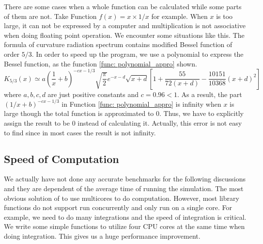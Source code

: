 \documentclass[12pt]{report}
\begin{document}
          There are some cases when a whole function can be calculated while some parts of them are not. 
          Take Function $f\left(x\right) = x\times1/x$ for example. When $x$ is too large, it 
          can not be expressed by a computer and multiplication is not associative when doing floating 
          point operation. We encounter some situations like this.
          The formula of curvature radiation spectrum contains modified Bessel function of order $5/3$.
          In order to speed up the program, we use a polynomial to express the Bessel function, as the 
          function \ref{func: polynomial_appro} shown. 
          \begin{equation}
            K_{5/3} \left(x\right) \simeq a \left(\frac{1}{x} + b\right)^{-cx - 1/3} \sqrt{\frac{\pi}{2}} e^{-x - d} \sqrt{x + d} %
            \left[1 + \frac{55}{72\left(x + d\right)} - \frac{10151}{10368}\left(x+d\right)^2\right] 
            \label{func: polynomial_appro}
          \end{equation}
          where $a,b,c,d$ are just positive constants and $c = 0.96 < 1$. As a result, 
          the part $(1/x + b)^{-cx - 1/3}$ in Function \ref{func: polynomial_appro} is infinity
          when $x$ is large though the total function is approximated to $0$. Thus, we have to explicitly 
          assign the result to be $0$ instead of calculating it. Actually, this error is not easy to find 
          since in most cases the result is not infinity. 
          
        \subsection{Speed of Computation}
          We actually have not done any accurate benchmarks for the following discussions and they are 
          dependent of the average time of running the simulation.
          The most obvious solution of to use multicores to do computation. However, most library functions 
          do not support run concurrently and only run on a single core. For example, we need to do many 
          integrations and the speed of integration is critical. We write some simple functions to 
          utilize four CPU cores at the same time when doing integration. 
          This gives us a huge performance improvement.
\end{document}
